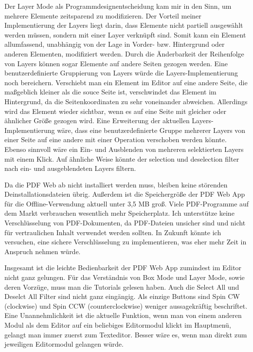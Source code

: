 \par
Der Layer Mode als Programmdesignentscheidung kam mir in den Sinn, um mehrere Elemente zeitsparend zu modifizieren. Der Vorteil meiner Implementierung der Layers liegt darin, dass Elemente nicht partiell ausgewählt werden müssen, sondern mit einer Layer verknüpft sind. Somit kann ein Element allumfassend, unabhängig von der Lage in Vorder- bzw. Hintergrund oder anderen Elementen, modifiziert werden. Durch die Änderbarkeit der Reihenfolge von Layers können sogar Elemente auf andere Seiten gezogen werden. Eine benutzerdefinierte Gruppierung von Layers würde die Layers-Implementierung noch bereichern. Verschiebt man ein Element im Editor auf eine andere Seite, die maßgeblich kleiner als die souce Seite ist, verschwindet das Element im Hintergrund, da die Seitenkoordinaten zu sehr voneinander abweichen. Allerdings wird das Element wieder sichtbar, wenn es auf eine Seite mit gleicher oder ähnlicher Größe gezogen wird. Eine Erweiterung der aktuellen Layers-Implementierung wäre, dass eine benutzerdefinierte Gruppe mehrerer Layers von einer Seite auf eine andere mit einer Operation verschoben werden könnte. Ebenso sinnvoll wäre ein Ein- und Ausblenden von mehreren selektierten Layers mit einem Klick. Auf ähnliche Weise könnte der selection und deselection filter nach ein- und ausgeblendeten Layers filtern. 
\par   
Da die PDF Web ab nicht installiert werden muss, bleiben keine störenden Deinstallationsdateien übrig. Außerdem ist die Speichergröße der PDF Web App für die Offline-Verwendung aktuell unter 3,5 MB groß. Viele PDF-Programme auf dem Markt verbrauchen wesentlich mehr Speicherplatz. Ich unterstütze keine Verschlüsselung von PDF-Dokumenten, da PDF-Dateien unsicher sind und nicht für vertraulichen Inhalt verwendet werden sollten. In Zukunft könnte ich versuchen, eine sichere Verschlüsselung zu implementieren, was eher mehr Zeit in Anspruch nehmen würde.
\par
Insgesamt ist die leichte Bedienbarkeit der PDF Web App zumindest im Editor nicht ganz gelungen. Für das Verständnis von Box Mode und Layer Mode, sowie deren Vorzüge, muss man die Tutorials gelesen haben. Auch die Select All und Deselct All Filter sind nicht ganz eingängig. Als einzige Buttons sind Spin CW (clockwise) und Spin CCW (counterclockwise) weniger aussagekräftig beschriftet. Eine Unannehmlichkeit ist die aktuelle Funktion, wenn man von einem anderen Modul als dem Editor auf ein beliebiges Editormodul klickt im Hauptmenü, gelangt man immer zuerst zum Texteditor. Besser wäre es, wenn man direkt zum jeweiligen Editormodul gelangen würde.

